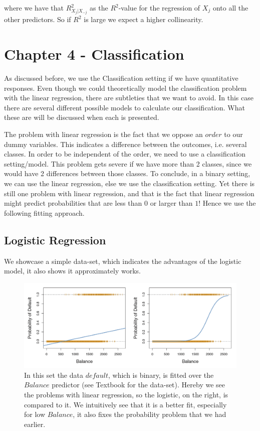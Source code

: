 \documentclass{article}
\begin{document}
where we have that $R^2_{X_j|X_{-j}}$ as the $R^2$-value for the regression of $X_j$ onto all the other predictors. So if $R^2$ is large we expect a higher collinearity.  


\newpage
\section{Chapter 4 - Classification}

As discussed before, we use the Classification setting if we have quantitative responses. Even though we could theoretically model the classification problem with the linear regression, there are subtleties that we want to avoid. In this case there are several different possible models to calculate our classification. What these are will be discussed when each is presented. \par
The problem with linear regression is the fact that we oppose an $order$ to our dummy variables. This indicates a difference between the outcomes, i.e. several classes. In order to be independent of the order, we need to use a classification setting/model. This problem gets severe if we have more than 2 classes, since we would have 2 differences between those classes. To conclude, in a binary setting, we can use the linear regression, else we use the classification setting. Yet there is still one problem with linear regression, and that is the fact that linear regression might predict probabilities that are less than $0$ or larger than $1$! Hence we use the following fitting approach.

\subsection{Logistic Regression}

We showcase a simple data-set, which indicates the advantages of the logistic model, it also shows it approximately works. 


\begin{figure}[ht]
    \centering
    \includegraphics[width=\textwidth]{linear_logistic.png}
    \caption{In this set the data $default$, which is binary, is fitted over the $Balance$ predictor (see Textbook for the data-set). Hereby we see the problems with linear regression, so the logistic, on the right, is compared to it. We intuitively see that it is a better fit, especially for low $Balance$, it also fixes the probability problem that we had earlier.}
    \label{fig:linear_logistic_showcase}
\end{figure}
\end{document}
